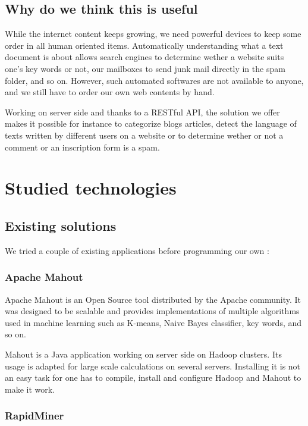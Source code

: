 \documentclass[a4paper,11pt]{article}
\begin{document}
\subsection{Why do we think this is useful}

While the internet content keeps growing, we need powerful devices to keep
some order in all human oriented items. Automatically understanding what a
text document is about allows search engines to determine wether a website
suits one's key words or not, our mailboxes to send junk mail directly in the
spam folder, and so on. However, such automated softwares are not available to
anyone, and we still have to order our own web contents by hand.

Working on server side and thanks to a RESTful API, the solution we offer
makes it possible for instance to categorize blogs articles, detect the
language of texts written by different users on a website or to determine
wether or not a comment or an inscription form is a spam.


\section{Studied technologies}

\subsection{Existing solutions}

We tried a couple of existing applications before programming our own :

\subsubsection{Apache Mahout}

Apache Mahout is an Open Source tool distributed by the Apache community.
It was designed to be scalable and provides implementations of multiple
algorithms used in machine learning such as K-means, Naive Bayes classifier,
key words, and so on.

Mahout is a Java application working on server side on Hadoop clusters. Its
usage is adapted for large scale calculations on several servers. Installing
it is not an easy task for one has to compile, install and configure Hadoop
and Mahout to make it work.


\subsubsection{RapidMiner}
\end{document}
